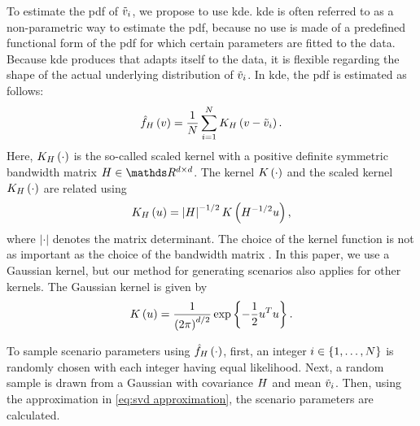 To estimate the \ac{pdf} of $\tilde{v}_{i}$, we propose to use \ac{kde}.
\ac{kde} \autocite{rosenblatt1956remarks, parzen1962estimation} is often referred to as a non-parametric way to estimate the \ac{pdf}, because no use is made of a predefined functional form of the \ac{pdf} for which certain parameters are fitted to the data.
Because \ac{kde} produces  that adapts itself to the data, it is flexible regarding the shape of the actual underlying distribution of $\tilde{v}_{i}$.
In \ac{kde}, the \ac{pdf} is estimated as follows:
\begin{equation}
	\label{eq:density est kde}
	\hat{f}_{H}\left( v \right) = \frac{1}{N} 
	\sum_{i=1}^{N} K_{H} \left( v - \tilde{v}_{i} \right).
\end{equation}
Here, $K_{H} \left( \cdot \right)$ is the so-called scaled kernel with a positive definite symmetric bandwidth matrix $\bandwidthmatrix \in \realnumbers^{\dimension \times \dimension}$.
The kernel $K \left( \cdot \right)$ and the scaled kernel $K_{H} \left( \cdot \right)$ are related using
\begin{equation}
	K_{H} \left( u \right) = \left|H\right|^{-1/2} K \left( H^{-1/2} u \right),
\end{equation}
where $|\cdot|$ denotes the matrix determinant. 
The choice of the kernel function is not as important as the choice of the bandwidth matrix \autocite{turlach1993bandwidthselection, duong2007ks}.
In this paper, we use a Gaussian kernel, but our method for generating scenarios also applies for other kernels. 
The Gaussian kernel is given by
\begin{equation}
	K \left( u \right) = \frac{1}{\left(2\pi\right)^{d/2}} \exp\left\{ -\frac{1}{2} u^T u \right\}.
\end{equation}

To sample scenario parameters using $\hat{f}_{H}\left( \cdot \right)$, first, an integer $i \in \{1,\ldots,N\}$ is randomly chosen with each integer having equal likelihood. 
Next, a random sample is drawn from a Gaussian with covariance $H$ and mean $\tilde{v}_{i}$.
Then, using the approximation in \cref{eq:svd approximation}, the scenario parameters are calculated.
